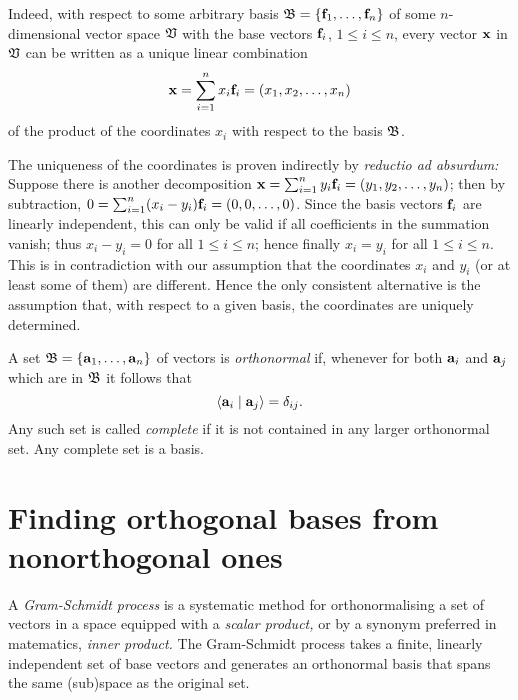 Indeed, with respect to some arbitrary  basis ${\frak B}=\{
{\bf f}_1, \ldots , {\bf f}_n\}$ of some $n$-dimensional vector space ${\frak V}$
with the base vectors ${\bf f}_i$, $1\le i\le n$, every vector ${\bf x}$ in  ${\frak V}$
can be written as a unique linear combination
\begin{equation}
{\bf x} = \sum_{i=1}^n x_i{\bf f}_i = (x_1,x_2, \ldots , x_n)
\end{equation}
of the product of the coordinates $x_i$ with respect to the basis  ${\frak B}$.

{\color{OliveGreen}
\bproof
The uniqueness of the coordinates is proven indirectly by {\em reductio ad absurdum:}
Suppose there is another decomposition
${\bf x} = \sum_{i=1}^n y_i{\bf f}_i = (y_1,y_2, \ldots , y_n) $;
then by subtraction, $0 = \sum_{i=1}^n (x_i-y_i) {\bf f}_i = (0,0, \ldots , 0)$.
Since the basis vectors ${\bf f}_i$ are linearly independent,
this can only be valid if all coefficients in the summation  vanish;
thus $x_i-y_i=0$ for all $1\le i\le n$; hence finally  $x_i=y_i$ for all $1\le i\le n$.
This is in contradiction with our assumption that the coordinates $x_i$ and $y_i$
(or at least some of them) are different.
Hence the only consistent alternative is the assumption that, with respect to a given basis, the coordinates are uniquely determined.
\eproof
}

A  set    $\frak B = \{
{\bf a}_1, \ldots , {\bf a}_n\}$
of  vectors
is {\em orthonormal}
if, whenever  for both
${\bf a}_i$ and
${\bf a}_j$  which
are in
${\frak B}$
it follows that
\begin{equation}
\langle {\bf a}_i \mid {\bf a}_j \rangle =\delta_{ij}.
\end{equation}
Any such set is called {\em complete}
if it is not contained in any larger orthonormal set.
Any complete set is a basis.


\section{Finding orthogonal bases from nonorthogonal ones}

A {\em Gram-Schmidt process} is a systematic method for orthonormalising a set of vectors
in a space equipped with a {\em scalar product,}
or by a synonym preferred in matematics, {\em inner product.}
The Gram-Schmidt process takes a finite, linearly independent set
of base vectors
and generates an orthonormal basis that spans the same (sub)space as the original set.

